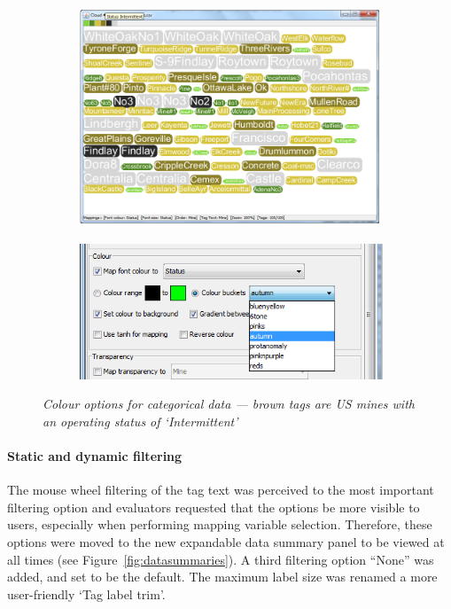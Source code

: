\begin{figure}[!htb]
\centering
\begin{subfigure}{\textwidth}
	\centering 
	\includegraphics[scale=0.4]{colourmappingcloud.png}
\end{subfigure}
\begin{subfigure}{\textwidth}
	\centering
	\includegraphics[scale=1.8]{colourmapping.png}
\end{subfigure}
\caption{\textit{Colour options for categorical data --- brown tags are US mines with an operating status of `Intermittent'}}
\label{fig:colourmapping}
\end{figure}

\paragraph{Static and dynamic filtering}

The mouse wheel filtering of the tag text was perceived to the most important filtering option and evaluators requested that the options be more visible to users, especially when performing mapping variable selection. Therefore, these options were moved to the new expandable data summary panel to be viewed at all times (see Figure~\vref{fig:datasummaries}). A third filtering option ``None'' was added, and set to be the default. The maximum label size was renamed a more user-friendly `Tag label trim'. 

